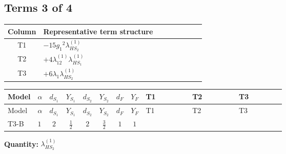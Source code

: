 \documentclass[8pt]{article}
\begin{document}
\begin{landscape}
\subsection*{Terms 3 of 4}
\begin{center}
\begin{tabular}{@{}c >{\raggedright\arraybackslash}p{0.82\linewidth}@{}}
\toprule
Column & Representative term structure \\
\midrule
T1 & \(\displaystyle -15 {g_1}^2 {\lambda_{HS_2}^{(1)}}\) \\
\midrule
T2 & \(\displaystyle +4 {\lambda_{12}^{(1)}} {\lambda_{HS_1}^{(1)}}\) \\
\midrule
T3 & \(\displaystyle +6 {\lambda_1} {\lambda_{HS_2}^{(1)}}\) \\
\midrule
\bottomrule
\end{tabular}
\end{center}
\smallskip
\tiny
\begin{longtable}{@{}llcccccc >{\raggedright\arraybackslash}p{0.21\linewidth} >{\raggedright\arraybackslash}p{0.21\linewidth} >{\raggedright\arraybackslash}p{0.21\linewidth}@{}}
\toprule
Model & $\alpha$ & $d_{S_1}$ & $Y_{S_1}$ & $d_{S_2}$ & $Y_{S_2}$ & $d_F$ & $Y_F$ & T1 & T2 & T3 \\
\midrule
\endfirsthead
\toprule
Model & $\alpha$ & $d_{S_1}$ & $Y_{S_1}$ & $d_{S_2}$ & $Y_{S_2}$ & $d_F$ & $Y_F$ & T1 & T2 & T3 \\
\midrule
\endhead
T3-B & $1$ & $2$ & $\frac{1}{2}$ & $2$ & $\frac{3}{2}$ & $1$ & $1$ & \scriptsize\adjustbox{max width=\linewidth}{$\begin{gathered} -15 {g_1}^2 {\lambda_{HS_2}^{(1)}}\end{gathered}$} & \scriptsize\adjustbox{max width=\linewidth}{$\begin{gathered} +4 {\lambda_{12}^{(1)}} {\lambda_{HS_1}^{(1)}}\end{gathered}$} & \scriptsize\adjustbox{max width=\linewidth}{$\begin{gathered} +6 {\lambda_1} {\lambda_{HS_2}^{(1)}}\end{gathered}$} \\
\midrule
\bottomrule
\end{longtable}
\clearpage
\noindent\textbf{Quantity: }$\lambda_{HS_2}^{(1)}$\par\smallskip

\end{landscape}
\end{document}
